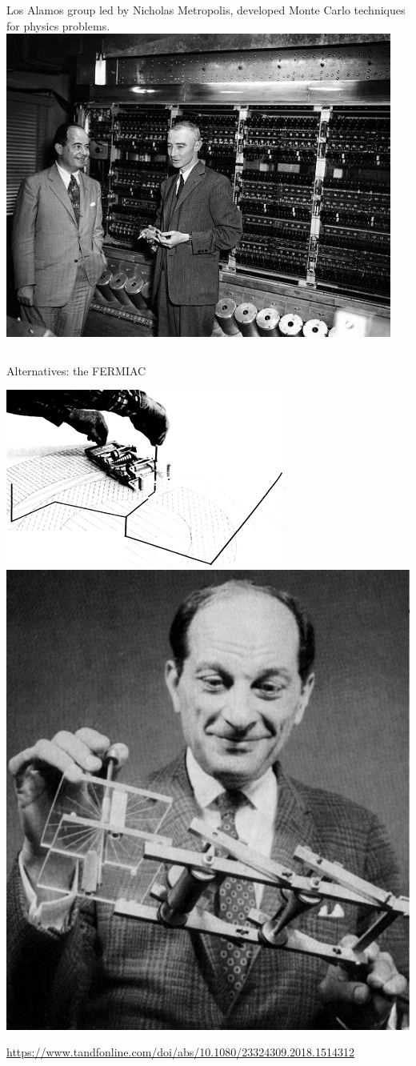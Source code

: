 \documentclass[aspectratio=169]{beamer}
\begin{document}
\begin{frame}{}
\begin{columns}
\vspace{0.25 cm}
Los Alamos group led by Nicholas Metropolis, developed Monte Carlo techniques for physics problems.
\includegraphics[width=\linewidth]{neumann_oppie.jpg}
\end{columns}
\end{frame}

\begin{frame}{Alternatives: the FERMIAC}


\begin{center}
\includegraphics[height=5.5 cm]{FERMIAC.jpg}\hspace{0.25 cm}\includegraphics[height=5.5 cm]{STAN_ULAM_HOLDING_THE_FERMIAC.jpg}
\end{center}

\small
\vspace{0.5 cm}
\textcolor{blue}{\url{https://www.tandfonline.com/doi/abs/10.1080/23324309.2018.1514312}}

\end{frame}
\end{document}
